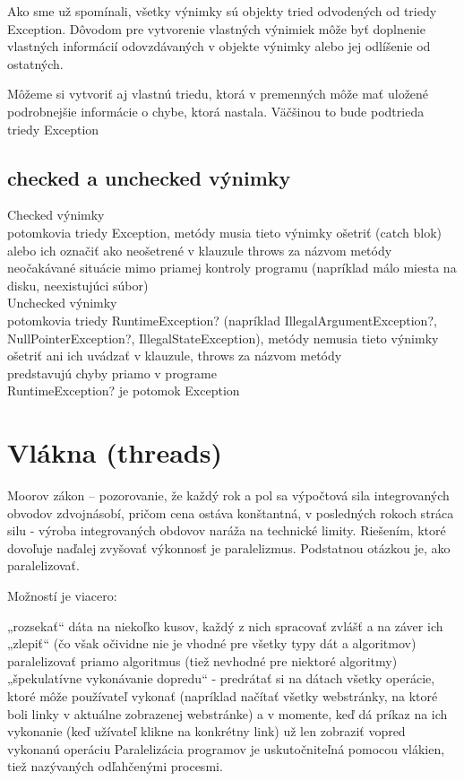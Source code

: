 Ako sme už spomínali, všetky výnimky sú objekty tried odvodených od triedy Exception. Dôvodom pre vytvorenie vlastných výnimiek môže byť doplnenie vlastných informácií odovzdávaných v objekte výnimky alebo jej odlíšenie od ostatných.

	Môžeme si vytvoriť aj vlastnú triedu, ktorá v premenných môže mať uložené podrobnejšie informácie o chybe, ktorá nastala.
	Väčšinou to bude podtrieda triedy Exception




	\subsection{checked a unchecked výnimky}
Checked výnimky\\
	\tab potomkovia triedy Exception, metódy musia tieto výnimky ošetriť (catch blok) alebo ich označiť ako neošetrené v klauzule throws za názvom metódy\\
	\tab neočakávané situácie mimo priamej kontroly programu (napríklad málo miesta na disku, neexistujúci súbor)\\
Unchecked výnimky\\
	\tab potomkovia triedy RuntimeException? (napríklad IllegalArgumentException?, NullPointerException?, IllegalStateException), metódy nemusia tieto výnimky ošetriť ani ich uvádzať v klauzule,  throws za názvom metódy\\
	\tab predstavujú chyby priamo v programe\\
RuntimeException? je potomok Exception\\


\section{Vlákna (threads)}


	Moorov zákon -- pozorovanie, že každý rok a pol sa výpočtová sila integrovaných obvodov zdvojnásobí, pričom cena ostáva konštantná, v posledných rokoch stráca silu - výroba integrovaných obdovov naráža na technické limity. Riešením, ktoré dovoľuje naďalej zvyšovať výkonnosť je paralelizmus. Podstatnou otázkou je, ako paralelizovať.

Možností je viacero:

„rozsekať“ dáta na niekoľko kusov, každý z nich spracovať zvlášť a na záver ich „zlepiť“ (čo však očividne nie je vhodné pre všetky typy dát a algoritmov)
paralelizovať priamo algoritmus (tiež nevhodné pre niektoré algoritmy)
„špekulatívne vykonávanie dopredu“ - predrátať si na dátach všetky operácie, ktoré môže používateľ vykonať (napríklad načítať všetky webstránky, na ktoré boli linky v aktuálne zobrazenej webstránke) a v momente, keď dá príkaz na ich vykonanie (keď užívateľ klikne na konkrétny link) už len zobraziť vopred vykonanú operáciu
Paralelizácia programov je uskutočniteľná pomocou vlákien, tiež nazývaných odľahčenými procesmi.

